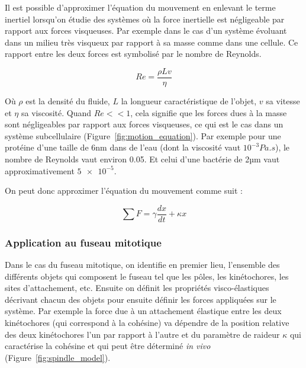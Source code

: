 \documentclass[12pt,a4paper,twoside,openright]{book}
\begin{document}
Il est possible d'approximer l'équation du mouvement en enlevant le
terme inertiel lorsqu'on étudie des systèmes où la force inertielle est
négligeable par rapport aux forces visqueuses. Par exemple dans le cas
d'un système évoluant dans un milieu très visqueux par rapport à sa
masse comme dans une cellule. Ce rapport entre les deux forces est
symbolisé par le nombre de Reynolds.

\[
Re = \frac{\rho Lv}{\eta}
\]

Où \(\rho\) est la densité du fluide, \(L\) la longueur caractéristique
de l'objet, \(v\) sa vitesse et \(\eta\) sa viscosité. Quand
\(Re << 1\), cela signifie que les forces dues à la masse sont
négligeables par rapport aux forces visqueuses, ce qui est le cas dans
un système subcellulaire (Figure~\ref{fig:motion_equation}). Par exemple
pour une protéine d'une taille de 6nm dans de l'eau (dont la viscosité
vaut \(10^{-3}Pa.s\)), le nombre de Reynolds vaut environ 0.05. Et celui
d'une bactérie de 2µm vaut approximativement \(\num{5e-5}\).

On peut donc approximer l'équation du mouvement comme suit :

\[
\sum F = \gamma\frac{dx}{dt} + \kappa x
\]

\subsubsection{Application au fuseau
mitotique}\label{application-au-fuseau-mitotique}

Dans le cas du fuseau mitotique, on identifie en premier lieu,
l'ensemble des différents objets qui composent le fuseau tel que les
pôles, les kinétochores, les sites d'attachement, etc. Ensuite on
définit les propriétés visco-élastiques décrivant chacun des objets pour
ensuite définir les forces appliquées sur le système. Par exemple la
force due à un attachement élastique entre les deux kinétochores (qui
correspond à la cohésine) va dépendre de la position relative des deux
kinétochores l'un par rapport à l'autre et du paramètre de raideur
\(\kappa\) qui caractérise la cohésine et qui peut être déterminé
\emph{in vivo} (Figure~\ref{fig:spindle_model}).
\end{document}
